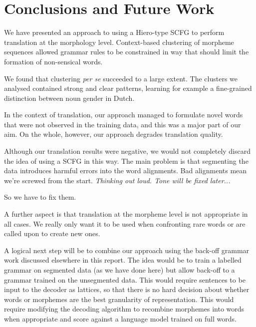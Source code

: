 \section{Conclusions and Future Work}
We have presented an approach to using a Hiero-type SCFG to perform translation at the morphology level.
Context-based clustering of morpheme sequences allowed grammar rules to be constrained in way that should limit the formation of non-sensical words.

We found that clustering \textit{per se} succeeded to a large extent.
The clusters we analysed contained strong and clear patterns, learning for example a fine-grained distinction between noun gender in Dutch.

In the context of translation, our approach managed to formulate novel words that were not observed in the training data, and this was a major part of our aim.
On the whole, however, our approach degrades translation quality.

Although our translation results were negative, we would not completely discard the idea of using a SCFG in this way. 
The main problem is that segmenting the data introduces harmful errors into the word alignments.
Bad alignments mean we're screwed from the start. \textit{Thinking out loud. Tone will be fixed later...}

So we have to fix them. 

A further aspect is that translation at the morpheme level is not appropriate in all cases.
We really only want it to be used when confronting rare words or are called upon to create new ones.

A logical next step will be to combine our approach using the back-off grammar work discussed elsewhere in this report.
The idea would be to train a labelled grammar on segmented data (as we have done here) but allow back-off to a grammar trained on the unsegmented data.
This would require sentences to be input to the decoder as lattices, so that there is no hard decision about whether words or morphemes are the best granularity of representation.
This would require modifying the decoding algorithm to recombine morphemes into words when appropriate and score against a language model trained on full words.


%













